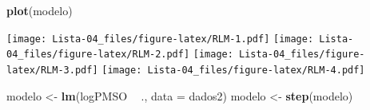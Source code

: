 \documentclass[
]{article}
\newenvironment{Shaded}{\begin{snugshade}}{\end{snugshade}}
\newcommand{\DataTypeTok}[1]{\textcolor[rgb]{0.13,0.29,0.53}{#1}}
\newcommand{\KeywordTok}[1]{\textcolor[rgb]{0.13,0.29,0.53}{\textbf{#1}}}
\newcommand{\NormalTok}[1]{#1}
\newcommand{\OperatorTok}[1]{\textcolor[rgb]{0.81,0.36,0.00}{\textbf{#1}}}
\newcommand{\StringTok}[1]{\textcolor[rgb]{0.31,0.60,0.02}{#1}}
\begin{document}
\begin{Shaded}
\begin{Highlighting}[]
\KeywordTok{plot}\NormalTok{(modelo)}
\end{Highlighting}
\end{Shaded}

\texttt{[image: Lista-04\_files/figure-latex/RLM-1.pdf]}
\texttt{[image: Lista-04\_files/figure-latex/RLM-2.pdf]}
\texttt{[image: Lista-04\_files/figure-latex/RLM-3.pdf]}
\texttt{[image: Lista-04\_files/figure-latex/RLM-4.pdf]}

\begin{Shaded}
\begin{Highlighting}[]
\NormalTok{modelo <-}\StringTok{ }\KeywordTok{lm}\NormalTok{(logPMSO }\OperatorTok{~}\StringTok{ }\NormalTok{., }\DataTypeTok{data =}\NormalTok{ dados2)}
\NormalTok{modelo <-}\StringTok{ }\KeywordTok{step}\NormalTok{(modelo)}
\end{Highlighting}
\end{Shaded}
\end{document}
